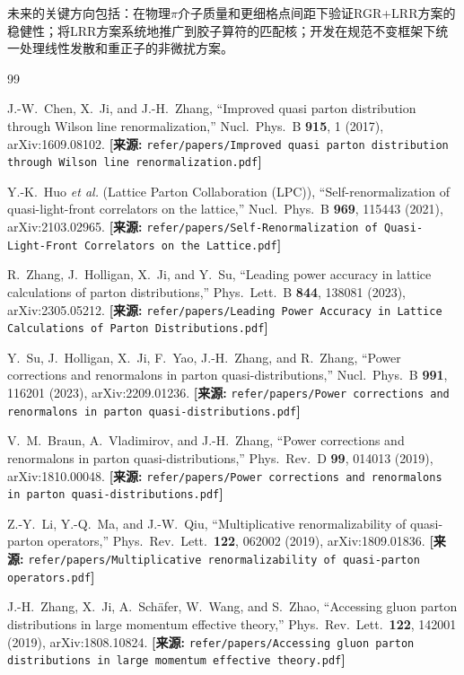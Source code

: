 \documentclass[12pt,a4paper]{ctexart}
\theoremstyle{definition}
\begin{document}
未来的关键方向包括：在物理$\pi$介子质量和更细格点间距下验证RGR+LRR方案的稳健性；将LRR方案系统地推广到胶子算符的匹配核；开发在规范不变框架下统一处理线性发散和重正子的非微扰方案。

\begin{thebibliography}{99}

J.-W.~Chen, X.~Ji, and J.-H.~Zhang,
``Improved quasi parton distribution through Wilson line renormalization,''
Nucl.\ Phys.\ B \textbf{915}, 1 (2017), arXiv:1609.08102.
\quad\textbf{[来源:} \texttt{refer/papers/Improved quasi parton distribution through Wilson line renormalization.pdf}\textbf{]}

Y.-K.~Huo \textit{et al.} (Lattice Parton Collaboration (LPC)),
``Self-renormalization of quasi-light-front correlators on the lattice,''
Nucl.\ Phys.\ B \textbf{969}, 115443 (2021), arXiv:2103.02965.
\quad\textbf{[来源:} \texttt{refer/papers/Self-Renormalization of Quasi-Light-Front Correlators on the Lattice.pdf}\textbf{]}

R.~Zhang, J.~Holligan, X.~Ji, and Y.~Su,
``Leading power accuracy in lattice calculations of parton distributions,''
Phys.\ Lett.\ B \textbf{844}, 138081 (2023), arXiv:2305.05212.
\quad\textbf{[来源:} \texttt{refer/papers/Leading Power Accuracy in Lattice Calculations of Parton Distributions.pdf}\textbf{]}

Y.~Su, J.~Holligan, X.~Ji, F.~Yao, J.-H.~Zhang, and R.~Zhang,
``Power corrections and renormalons in parton quasi-distributions,''
Nucl.\ Phys.\ B \textbf{991}, 116201 (2023), arXiv:2209.01236.
\quad\textbf{[来源:} \texttt{refer/papers/Power corrections and renormalons in parton quasi-distributions.pdf}\textbf{]}

V.~M.~Braun, A.~Vladimirov, and J.-H.~Zhang,
``Power corrections and renormalons in parton quasi-distributions,''
Phys.\ Rev.\ D \textbf{99}, 014013 (2019), arXiv:1810.00048.
\quad\textbf{[来源:} \texttt{refer/papers/Power corrections and renormalons in parton quasi-distributions.pdf}\textbf{]}

Z.-Y.~Li, Y.-Q.~Ma, and J.-W.~Qiu,
``Multiplicative renormalizability of quasi-parton operators,''
Phys.\ Rev.\ Lett.\ \textbf{122}, 062002 (2019), arXiv:1809.01836.
\quad\textbf{[来源:} \texttt{refer/papers/Multiplicative renormalizability of quasi-parton operators.pdf}\textbf{]}

J.-H.~Zhang, X.~Ji, A.~Sch\"afer, W.~Wang, and S.~Zhao,
``Accessing gluon parton distributions in large momentum effective theory,''
Phys.\ Rev.\ Lett.\ \textbf{122}, 142001 (2019), arXiv:1808.10824.
\quad\textbf{[来源:} \texttt{refer/papers/Accessing gluon parton distributions in large momentum effective theory.pdf}\textbf{]}


\end{thebibliography}
\end{document}
